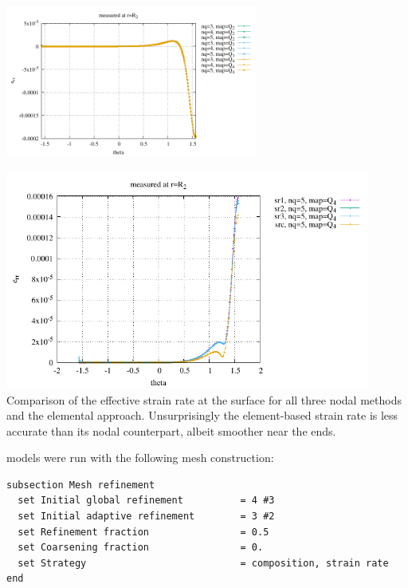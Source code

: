 \begin{center}
\includegraphics[width=8.3cm]{python_codes/fieldstone_152/results/exp2_axisymmetric/err_R2}\\
\end{center}


\begin{center}
\includegraphics[width=12cm]{python_codes/fieldstone_152/results/exp2_axisymmetric/sr_R2_comparison}\\
{\captionfont Comparison of the effective strain rate at the surface for all three nodal methods and the 
elemental approach. Unsurprisingly the element-based strain rate is less accurate than its nodal counterpart, 
albeit smoother near the ends.}
\end{center}

\aspect models were run with the following mesh construction:
\begin{lstlisting}
subsection Mesh refinement
  set Initial global refinement          = 4 #3
  set Initial adaptive refinement        = 3 #2
  set Refinement fraction                = 0.5
  set Coarsening fraction                = 0.
  set Strategy                           = composition, strain rate
end
\end{lstlisting}


